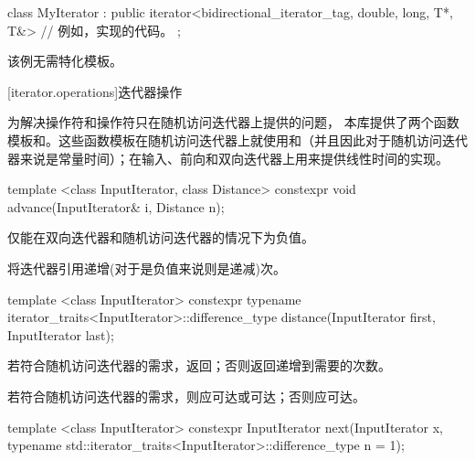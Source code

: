 \begin{codeblock}
class MyIterator :
  public iterator<bidirectional_iterator_tag, double, long, T*, T&> {
  // 例如，实现\tcode{++}的代码。
};
\end{codeblock}

\pnum
该例无需特化模板。
\exitexample

[iterator.operations]{迭代器操作}

\pnum
为解决\tcode{+}操作符和\tcode{-}操作符只在随机访问迭代器上提供的问题， 本库提供了两个函数模板和。这些函数模板在随机访问迭代器上就使用\tcode{+}和\tcode{-}（并且因此对于随机访问迭代器来说是常量时间）；在输入、前向和双向迭代器上用\tcode{++}来提供线性时间的实现。

%
\begin{itemdecl}
template <class InputIterator, class Distance>
  constexpr void advance(InputIterator& i, Distance n);
\end{itemdecl}

\begin{itemdescr}
\pnum
\requires
{}仅能在双向迭代器和随机访问迭代器的情况下为负值。

\pnum
\effects
将迭代器引用递增(对于是负值来说则是递减)次。
\end{itemdescr}

%
\begin{itemdecl}
template <class InputIterator>
  constexpr typename iterator_traits<InputIterator>::difference_type
    distance(InputIterator first, InputIterator last);
\end{itemdecl}

\begin{itemdescr}
\pnum
\effects
若符合随机访问迭代器的需求，返回；否则返回递增到需要的次数。

\pnum
\requires
若符合随机访问迭代器的需求，则应可达或可达；否则应可达。
\end{itemdescr}

%
\begin{itemdecl}
template <class InputIterator>
  constexpr InputIterator next(InputIterator x,
    typename std::iterator_traits<InputIterator>::difference_type n = 1);
\end{itemdecl}

